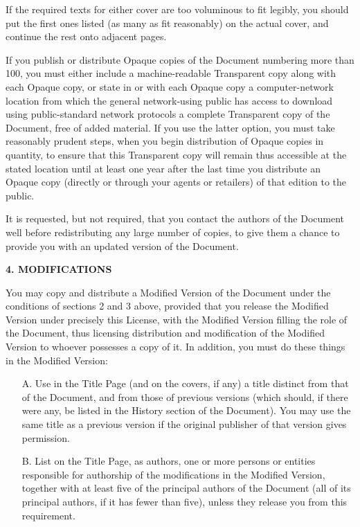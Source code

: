 \begin{scriptsize}
\begin{multicols}{2}
    If the required texts for either cover are too voluminous to fit legibly, you should put the first ones listed (as many as fit reasonably) on the actual cover, and continue the rest onto adjacent pages.

    If you publish or distribute Opaque copies of the Document numbering more than 100, you must either include a machine-readable Transparent copy along with each Opaque copy, or state in or with each Opaque copy a computer-network location from which the general network-using public has access to download using public-standard network protocols a complete Transparent copy of the Document, free of added material. If you use the latter option, you must take reasonably prudent steps, when you begin distribution of Opaque copies in quantity, to ensure that this Transparent copy will remain thus accessible at the stated location until at least one year after the last time you distribute an Opaque copy (directly or through your agents or retailers) of that edition to the public.

    It is requested, but not required, that you contact the authors of the Document well before redistributing any large number of copies, to give them a chance to provide you with an updated version of the Document.

    \begin{center}
      {\bf 4. MODIFICATIONS\par}
    \end{center}

    You may copy and distribute a Modified Version of the Document under the conditions of sections 2 and 3 above, provided that you release the Modified Version under precisely this License, with the Modified Version filling the role of the Document, thus licensing distribution and modification of the Modified Version to whoever possesses a copy of it. In addition, you must do these things in the Modified Version:

    \begin{itemize}
    \item[A.] 
      Use in the Title Page (and on the covers, if any) a title distinct from that of the Document, and from those of previous versions (which should, if there were any, be listed in the History section of the Document). You may use the same title as a previous version if the original publisher of that version gives permission.
   
    \item[B.]
      List on the Title Page, as authors, one or more persons or entities responsible for authorship of the modifications in the Modified Version, together with at least five of the principal authors of the Document (all of its principal authors, if it has fewer than five), unless they release you from this requirement.
   

\end{itemize}
\end{multicols}
\end{scriptsize}
